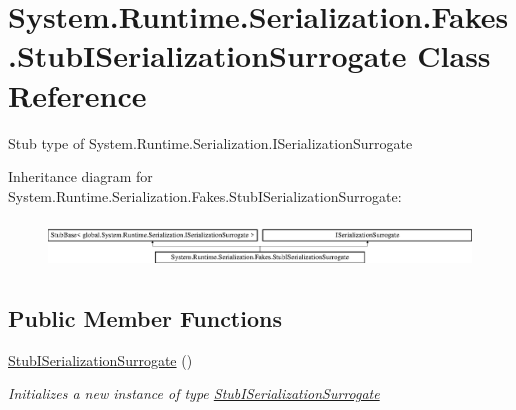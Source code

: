 \hypertarget{class_system_1_1_runtime_1_1_serialization_1_1_fakes_1_1_stub_i_serialization_surrogate}{\section{System.\-Runtime.\-Serialization.\-Fakes.\-Stub\-I\-Serialization\-Surrogate Class Reference}
\label{class_system_1_1_runtime_1_1_serialization_1_1_fakes_1_1_stub_i_serialization_surrogate}
}


Stub type of System.\-Runtime.\-Serialization.\-I\-Serialization\-Surrogate 


Inheritance diagram for System.\-Runtime.\-Serialization.\-Fakes.\-Stub\-I\-Serialization\-Surrogate\-:\begin{figure}[H]
\begin{center}
\leavevmode
\includegraphics[height=1.308411cm]{class_system_1_1_runtime_1_1_serialization_1_1_fakes_1_1_stub_i_serialization_surrogate}
\end{center}
\end{figure}
\subsection*{Public Member Functions}
\begin{DoxyCompactItemize}
\item 
\hyperlink{class_system_1_1_runtime_1_1_serialization_1_1_fakes_1_1_stub_i_serialization_surrogate_a3a2330a530c6b55b387aa89fca757e80}{Stub\-I\-Serialization\-Surrogate} ()
\begin{DoxyCompactList}\small\item\em Initializes a new instance of type \hyperlink{class_system_1_1_runtime_1_1_serialization_1_1_fakes_1_1_stub_i_serialization_surrogate}{Stub\-I\-Serialization\-Surrogate}\end{DoxyCompactList}\end{DoxyCompactItemize}
